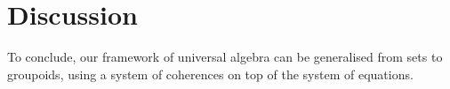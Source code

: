 \section{Discussion}
\label{sec:discussion}

To conclude, our framework of universal algebra can be generalised from sets to groupoids, using a system of
coherences on top of the system of equations.
